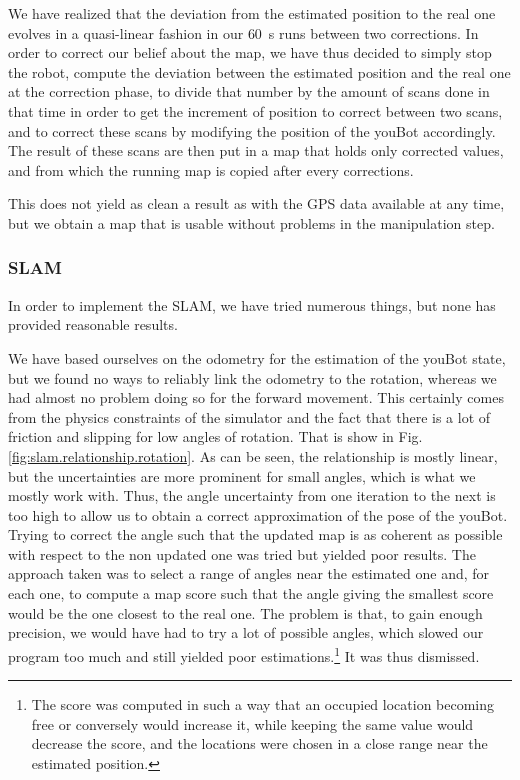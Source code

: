 \documentclass[a4paper, 10pt, conference]{ieeeconf}
\begin{document}
    We have realized that the deviation from the estimated position to the real one evolves in a quasi-linear fashion in our \SI{60}{\second} runs between two corrections. In order to correct our belief about the map, we have thus decided to simply stop the robot, compute the deviation between the estimated position and the real one at the correction phase, to divide that number by the amount of scans done in that time in order to get the increment of position to correct between two scans, and to correct these scans by modifying the position of the youBot accordingly. The result of these scans are then put in a map that holds only corrected values, and from which the running map is copied after every corrections.
    
    This does not yield as clean a result as with the GPS data available at any time, but we obtain a map that is usable without problems in the manipulation step.
    
    \subsubsection{SLAM}
    
    In order to implement the SLAM, we have tried numerous things, but none has provided reasonable results. 
    
    We have based ourselves on the odometry for the estimation of the youBot state, but we found no ways to reliably link the odometry to the rotation, whereas we had almost no problem doing so for the forward movement. This certainly comes from the physics constraints of the simulator and the fact that there is a lot of friction and slipping for low angles of rotation. That is show in Fig. \ref{fig:slam.relationship.rotation}. As can be seen, the relationship is mostly linear, but the uncertainties are more prominent for small angles, which is what we mostly work with. Thus, the angle uncertainty from one iteration to the next is too high to allow us to obtain a correct approximation of the pose of the youBot. Trying to correct the angle such that the updated map is as coherent as possible with respect to the non updated one was tried but yielded poor results. The approach taken was to select a range of angles near the estimated one and, for each one, to compute a map score such that the angle giving the smallest score would be the one closest to the real one. The problem is that, to gain enough precision, we would have had to try a lot of possible angles, which slowed our program too much and still yielded poor estimations.\footnote{The score was computed in such a way that an occupied location becoming free or conversely would increase it, while keeping the same value would decrease the score, and the locations were chosen in a close range near the estimated position.} It was thus dismissed.
    
\end{document}

